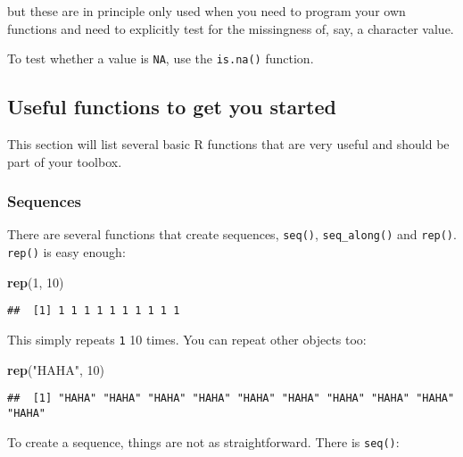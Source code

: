 \documentclass[
]{article}
\newenvironment{Shaded}{\begin{snugshade}}{\end{snugshade}}
\newcommand{\DecValTok}[1]{\textcolor[rgb]{0.00,0.00,0.81}{#1}}
\newcommand{\KeywordTok}[1]{\textcolor[rgb]{0.13,0.29,0.53}{\textbf{#1}}}
\newcommand{\NormalTok}[1]{#1}
\newcommand{\StringTok}[1]{\textcolor[rgb]{0.31,0.60,0.02}{#1}}
\begin{document}
but these are in principle only used when you need to program your own functions and need to explicitly test for the missingness of, say,
a character value.

To test whether a value is \texttt{NA}, use the \texttt{is.na()} function.

\hypertarget{useful-functions-to-get-you-started}{%
\subsection{Useful functions to get you started}\label{useful-functions-to-get-you-started}}

This section will list several basic R functions that are very useful and should be part of your toolbox.

\hypertarget{sequences}{%
\subsubsection{Sequences}\label{sequences}}

There are several functions that create sequences, \texttt{seq()}, \texttt{seq\_along()} and \texttt{rep()}. \texttt{rep()} is easy enough:

\begin{Shaded}
\begin{Highlighting}[]
\KeywordTok{rep}\NormalTok{(}\DecValTok{1}\NormalTok{, }\DecValTok{10}\NormalTok{)}
\end{Highlighting}
\end{Shaded}

\begin{verbatim}
##  [1] 1 1 1 1 1 1 1 1 1 1
\end{verbatim}

This simply repeats \texttt{1} 10 times. You can repeat other objects too:

\begin{Shaded}
\begin{Highlighting}[]
\KeywordTok{rep}\NormalTok{(}\StringTok{"HAHA"}\NormalTok{, }\DecValTok{10}\NormalTok{)}
\end{Highlighting}
\end{Shaded}

\begin{verbatim}
##  [1] "HAHA" "HAHA" "HAHA" "HAHA" "HAHA" "HAHA" "HAHA" "HAHA" "HAHA" "HAHA"
\end{verbatim}

To create a sequence, things are not as straightforward. There is \texttt{seq()}:
\end{document}
